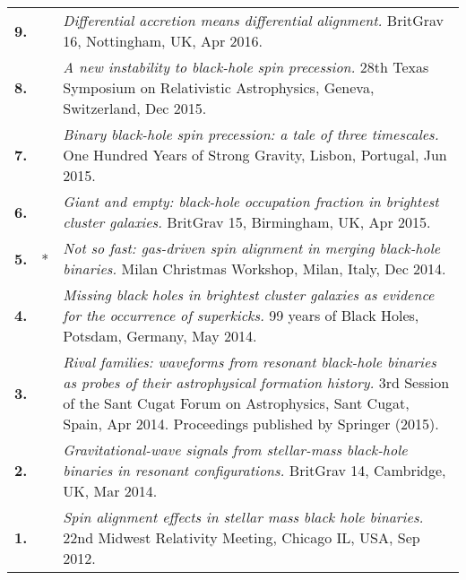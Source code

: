 \documentclass[11pt,letterpaper,sans]{moderncv}   %
\begin{document}
{\begin{longtable}{rp{0.4cm}p{15.8cm}}
%
\textbf{9.} & & \textit{Differential accretion means differential alignment.}
\newline{}BritGrav 16, Nottingham, UK, Apr 2016.
\vspace{0.05cm}\\
%
\textbf{8.} & & \textit{A new instability to black-hole spin precession.}
\newline{}28th Texas Symposium on Relativistic Astrophysics, Geneva, Switzerland, Dec 2015.
\vspace{0.05cm}\\
%
\textbf{7.} & & \textit{Binary black-hole spin precession: a tale of three timescales.}
\newline{} 
One Hundred Years of Strong Gravity, Lisbon, Portugal, Jun 2015.
\vspace{0.05cm}\\
%
\textbf{6.} & & \textit{Giant and empty: black-hole occupation fraction in brightest cluster galaxies.}
\newline{} 
BritGrav 15, Birmingham, UK, Apr 2015.
\vspace{0.05cm}\\
%
\textbf{5.} & * & \textit{Not so fast: gas-driven spin alignment in merging black-hole binaries.}
\newline{} 
Milan Christmas Workshop, Milan, Italy, Dec 2014.
\vspace{0.05cm}\\
%
\textbf{4.} & & \textit{Missing black holes in brightest cluster galaxies as evidence for the occurrence of superkicks.}
\newline{} 
99 years of Black Holes, Potsdam, Germany, May 2014.
\vspace{0.05cm}\\
%
\textbf{3.} & & \textit{Rival families: waveforms from resonant black-hole binaries as probes of their astrophysical formation history.}
\newline{} 
3rd Session of the Sant Cugat Forum on Astrophysics, Sant Cugat, Spain, Apr 2014.
\newline{} 
Proceedings published by Springer (2015).
\vspace{0.05cm}\\
%
\textbf{2.} & & \textit{Gravitational-wave signals from stellar-mass black-hole binaries in resonant configurations.}
\newline{} 
BritGrav 14, Cambridge, UK, Mar 2014.
\vspace{0.05cm}\\
%
\textbf{1.} & & \textit{Spin alignment effects in stellar mass black hole binaries.}
\newline{} 
22nd Midwest Relativity Meeting, Chicago IL, USA, Sep 2012.
\vspace{0.05cm}\\
\end{longtable}
}
\end{document}
